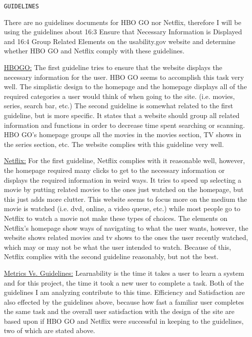 \documentclass[11pt]{article}
\begin{document}
\begin{verbatim}
GUIDELINES
\end{verbatim}
There are no guidelines documents for HBO GO nor Netflix, therefore I will be using the guidelines about 16:3 Ensure that Necessary Information is Displayed and 16:4 Group Related Elements on the usability.gov website and determine whether HBO GO and Netflix comply with these guidelines.

\underline{HBOGO:}
 The first guideline tries to ensure that the website displays the necessary information for the user. HBO GO seems to accomplish this task very well. The simplistic design to the homepage and the homepage displays all of the required categories a user would think of when going to the site. (i.e. movies, series, search bar, etc.) The second guideline is somewhat related to the first guideline, but is more specific. It states that a website should group all related information and functions in order to decrease time spent searching or scanning. HBO GO's homepage groups all the movies in the movies section, TV shows in the series section, etc. The website complies with this guideline very well.

\underline{Netflix:}
For the first guideline, Netflix complies with it reasonable well, however, the homepage required many clicks to get to the necessary information or displays the required information in weird ways. It tries to speed up selecting a movie by putting related movies to the ones just watched on the homepage, but this just adds more clutter. This website seems to focus more on the medium the movie is watched (i.e. dvd, online, a video queue, etc.) while most people go to Netflix to watch a movie not make these types of choices.
The elements on Netflix's homepage show ways of navigating to what the user wants, however, the website shows related movies and tv shows to the ones the user recently watched, which may or may not be what the user intended to watch. Because of this, Netflix complies with the second guideline reasonably, but not the best.

\underline{Metrics Vs. Guidelines:}
Learnability is the time it takes a user to learn a system and for this project, the time it took a new user to complete a task. Both of the guidelines I am analyzing contribute to this time. Efficiency and Satisfaction are also effected by the guidelines above, because how fast a familiar user completes the same task and the overall user satisfaction with the design of the site are based upon if HBO GO and Netflix were successful in keeping to the guidelines, two of which are stated above.
\end{document}
